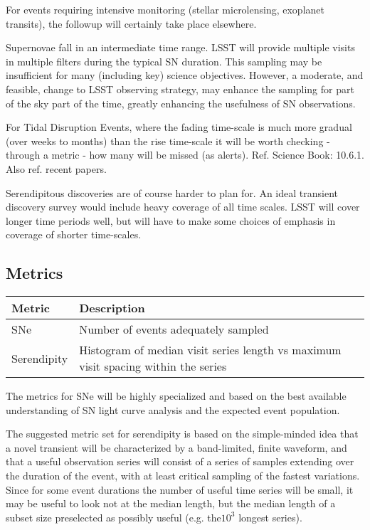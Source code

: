 For events requiring intensive monitoring (stellar microlensing, exoplanet transits), the followup will certainly take place elsewhere.

Supernovae fall in an intermediate time range.  LSST will provide multiple visits in multiple filters during the typical SN duration.  This sampling may be insufficient for many (including key) science objectives.  However, a moderate, and feasible, change to LSST observing strategy, may enhance the sampling for part of the sky part of the time, greatly enhancing the usefulness of SN observations.

For Tidal Disruption Events, where the fading time-scale is much more gradual (over weeks to months) than the rise time-scale it will be worth checking - through a metric - how many will be missed (as alerts). Ref. Science Book: 10.6.1. Also ref. recent papers.

Serendipitous discoveries are of course harder to plan for.  An ideal transient discovery survey would include heavy coverage of all time scales. LSST will cover longer time periods well, but will have to make some choices of emphasis in coverage of shorter time-scales.



\subsection{Metrics}
\label{sec:\secname:metrics}

\begin{center}
\begin{tabular}{| p{5cm} |p{10cm} |}
\hline Metric & Description\\
\hline
SNe & Number of events adequately sampled\\
Serendipity & Histogram of median visit series length vs maximum visit spacing within the series\\
  \hline \end{tabular}
 \end{center}

The metrics for SNe will be highly specialized and based on the best available understanding of SN light curve analysis and the expected event population.

The suggested metric set for serendipity is based on the simple-minded idea that a novel transient will be characterized by a band-limited, finite waveform, and that a useful observation series will consist of a series of samples extending over the duration of the event, with at least critical sampling of the fastest variations.  Since for some event durations the number of useful time series will be small, it may be useful to look not at the median length, but the median length of a subset size preselected as possibly useful (e.g. the$10^3$ longest series).

